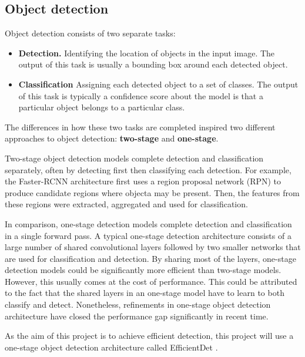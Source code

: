 \documentclass[12pt,a4paper,twoside,openany]{report}
\begin{document}
\subsection{Object detection}
Object detection consists of two separate tasks:
\begin{itemize}
    \item \textbf{Detection.} Identifying the location of objects in the input image. The output of this task is usually a bounding box around each detected object.
    \item \textbf{Classification} Assigning each detected object to a set of classes. The output of this task is typically a confidence score about the model is that a particular object belongs to a particular class.
\end{itemize}

The differences in how these two tasks are completed inspired two different approaches to object detection: \textbf{two-stage} and \textbf{one-stage}.

Two-stage object detection models complete detection and classification separately, often by detecting first then classifying each detection. For example, the Faster-RCNN architecture \cite{ren_faster_2016} first uses a region proposal network (RPN) to produce candidate regions where objecta may be present. Then, the features from these regions were extracted, aggregated and used for classification.

In comparison, one-stage detection models complete detection and classification in a single forward pass. A typical one-stage detection architecture consists of a large number of shared convolutional layers followed by two smaller networks that are used for classification and detection. 
By sharing most of the layers, one-stage detection models could be significantly more efficient than two-stage models. However, this usually comes at the cost of performance. This could be  attributed to the fact that the shared layers in an one-stage model have to learn to both classify and detect. Nonetheless, refinements in one-stage object detection architecture have closed the performance gap significantly in recent time. 

As the aim of this project is to achieve efficient detection, this project will use a one-stage object detection architecture called EfficientDet \cite{tan_efficientdet_2020}.
\end{document}
